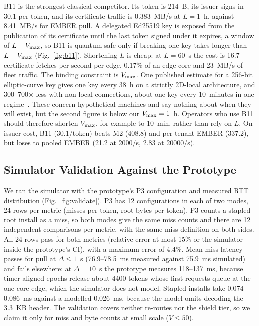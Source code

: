 B11 is the strongest classical competitor. Its token is 214~B, its issuer signs in 30.1\us{} per token, and its certificate traffic is 0.383~MB/s at $L=1$~h, against 8.41~MB/s for EMBER pull. A delegated Ed25519 key is exposed from the publication of its certificate until the last token signed under it expires, a window of $L+V_{\max}$, so B11 is quantum-safe only if breaking one key takes longer than $L+V_{\max}$ (Fig.~\ref{fig:b11}). Shortening $L$ is cheap: at $L=60$~s the cost is 16.7 certificate fetches per second per edge, 0.17\% of an edge core and 23~MB/s of fleet traffic. The binding constraint is $V_{\max}$. One published estimate for a 256-bit elliptic-curve key gives one key every 38~h on a strictly 2D-local architecture, and 300--700$\times$ less with non-local connections, about one key every 10~minutes in one regime~\cite{litinski2023ecc}. These concern hypothetical machines and say nothing about when they will exist, but the second figure is below our $V_{\max}=1$~h. Operators who use B11 should therefore shorten $V_{\max}$, for example to 10~min, rather than rely on $L$. On issuer cost, B11 (30.1\us/token) beats M2 (408.8) and per-tenant EMBER (337.2), but loses to pooled EMBER (21.2 at \num{2000}/s, 2.83 at \num{20000}/s).

\subsection{Simulator Validation Against the Prototype}
\label{sec:res-validate}



We ran the simulator with the prototype's P3 configuration and measured RTT distribution (Fig.~\ref{fig:validate}). P3 has 12 configurations in each of two modes, 24 rows per metric (misses per token, root bytes per token). P3 counts a stapled-root install as a miss, so both modes give the same miss counts and there are 12 independent comparisons per metric, with the same miss definition on both sides. All 24 rows pass for both metrics (relative error at most 15\% or the simulator inside the prototype's CI), with a maximum error of 4.4\%. Mean miss latency passes for pull at $\Delta\le1$~s (76.9--78.5~ms measured against 75.9~ms simulated) and fails elsewhere: at $\Delta=10$~s the prototype measures 118--137~ms, because timer-aligned epochs release about \num{4400} tokens whose first requests queue at the one-core edge, which the simulator does not model. Stapled installs take 0.074--0.086~ms against a modelled 0.026~ms, because the model omits decoding the 3.3~KB header. The validation covers neither re-routes nor the shield tier, so we claim it only for miss and byte counts at small scale ($V\le50$).

